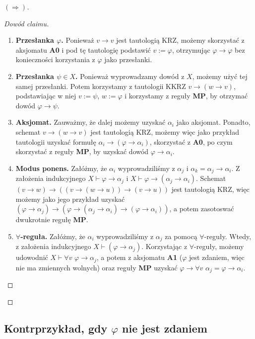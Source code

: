 \begin{proof}[\( (\Rightarrow) \)]
\begin{proof}[Dowód claimu]
    \begin{enumerate}
        \item \textbf{Przesłanka \( \varphi \).} Ponieważ \( v \to v \) jest tautologią KRZ, możemy skorzystać z aksjomatu \textbf{A0} i pod tę tautologię podstawić \(v := \varphi \), otrzymując \( \varphi \to \varphi \) bez konieczności korzystania z \( \varphi \) jako przesłanki.
        \item \textbf{Przesłanka \( \psi \in X \).} Ponieważ wyprowadzamy dowód z \( X \), możemy użyć tej samej przesłanki. Potem korzystamy z tautologii KKRZ \( v \to (w \to v) \), podstawiając w niej \( v := \psi \), \( w := \varphi \) i korzystamy z reguły \textbf{MP}, by otrzymać dowód \( \varphi \to \psi \).
        \item \textbf{Aksjomat.} Zauważmy, że dalej możemy uzyskać \( \alpha_i \) jako aksjomat. Ponadto, schemat \( v \to (w \to v) \) jest tautologią KRZ, możemy więc jako przykład tautologii uzyskać formułę \( \alpha_i \to (\varphi \to \alpha_i) \), skorzystać z \textbf{A0}, po czym skorzystać z reguły \textbf{MP}, by uzyskać dowód \( \varphi \to \alpha_i \).
        \item \textbf{Modus ponens.} Załóżmy, że \( \alpha_i \) wyprowadziliśmy z \( \alpha_j \) i \( \alpha_k = \alpha_j \to \alpha_i \). Z założenia indukcyjnego \( X \vdash \varphi \to \alpha_j \) i \( X \vdash \varphi \to (\alpha_j \to \alpha_i) \). Schemat \( (v \to w) \to ((v \to (w \to u)) \to (v \to u)) \) jest tautologią KRZ, więc możemy jako jego przykład uzyskać \( (\varphi \to \alpha_j) \to (\varphi \to (\alpha_j \to \alpha_i) \to (\varphi \to \alpha_i)) \), a potem zasotoswać dwukrotnie regułę \textbf{MP}.
        \item \textbf{\( \forall \)-reguła.} Załóżmy, że \( \alpha_i \) wyprowadziliśmy z \( \alpha_j \) za pomocą \( \forall \)-reguły. Wtedy, z założenia indukcyjnego \( X \vdash (\varphi \to \alpha_j) \). Korzystając z \( \forall \)-reguły, możemy udowodnić \( X \vdash \forall v\,\,\varphi \to \alpha_j \), a potem z aksjomatu \textbf{A1} (\( \varphi \) jest zdaniem, więc nie ma zmiennych wolnych) oraz reguły \textbf{MP} uzyskać \( \varphi \to \forall v\,\,\alpha_j = \varphi \to \alpha_i \).
    \end{enumerate}
    
\end{proof}

\end{proof}

\subsection*{Kontrprzykład, gdy \(\varphi\) nie jest zdaniem}

